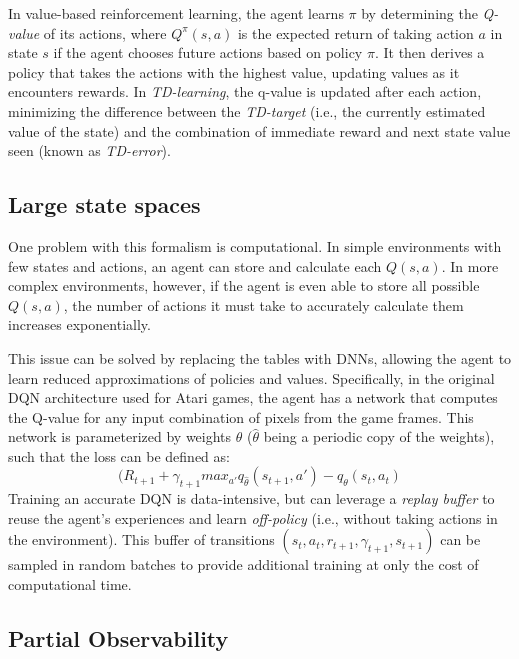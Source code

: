 \documentclass[letterpaper]{article}
\begin{document}
 	In value-based reinforcement learning, the agent learns $\pi$ by determining the \textit{Q-value} of its actions, where $Q^\pi(s,a)$ is the expected return of taking action $a$ in state $s$ if the agent chooses future actions based on policy $\pi$. It then derives a policy that takes the actions with the highest value, updating values as it encounters rewards. In \textit{TD-learning}, the q-value is updated after each action, minimizing the difference between the \textit{TD-target} (i.e., the currently estimated value of the state) and the combination of immediate reward and next state value seen (known as \textit{TD-error}).
 	
 	\subsection{Large state spaces}
 	
 	One problem with this formalism is computational. In simple environments with few states and actions, an agent can store and calculate each $Q(s,a)$. In more complex environments, however, if the agent is even able to store all possible $Q(s,a)$, the number of actions it must take to accurately calculate them increases exponentially.
 	
 	This issue can be solved by replacing the tables with DNNs, allowing the agent to learn reduced approximations of policies and values. Specifically, in the original DQN architecture \cite{mnih2015human} used for Atari games, the agent has a network that computes the Q-value for any input combination of pixels from the game frames. This network is parameterized by weights $\theta$ ($\widehat{\theta}$ being a periodic copy of the weights), such that the loss can be defined as:
 	\begin{equation}
	 	(R_{t+1}+\gamma_{t+1}max_{a'}q_{\widehat{\theta}}(s_{t+1}, a')-q_{\theta}(s_t, a_t)
 	\end{equation}
 	Training an accurate DQN is data-intensive, but can leverage a \textit{replay buffer} to reuse the agent's experiences and learn \textit{off-policy} (i.e., without taking actions in the environment). This buffer of transitions $(s_t, a_t, r_{t+1}, \gamma_{t+1}, s_{t+1})$ can be sampled in random batches to provide additional training at only the cost of computational time.
 	
 	\subsection{Partial Observability}
 	
\end{document}

